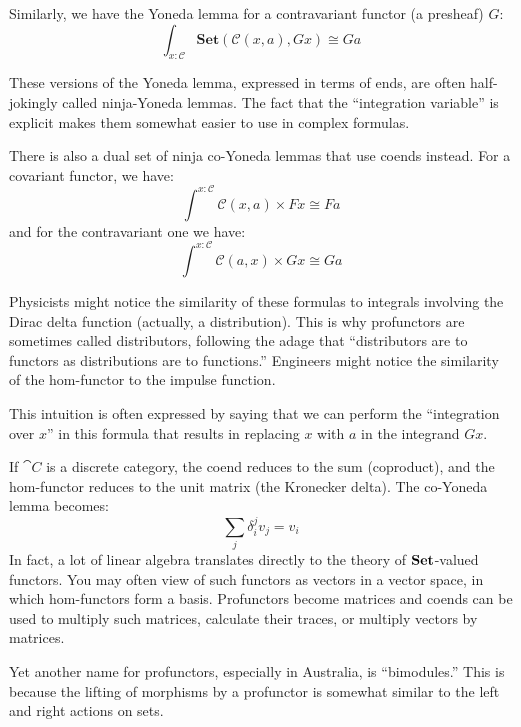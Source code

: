\documentclass[DaoFP]{subfiles}
\begin{document}
Similarly, we have the Yoneda lemma for a contravariant functor (a presheaf) $G$:
\[ \int_{x \colon \mathcal{C}} \mathbf{Set} (\mathcal{C}(x, a), G x) \cong G a \]

These versions of the Yoneda lemma, expressed in terms of ends, are often half-jokingly called ninja-Yoneda lemmas. The fact that the ``integration variable'' is explicit makes them somewhat easier to use in complex formulas.

There is also a dual set of ninja co-Yoneda lemmas that use coends instead. For a covariant functor, we have:
\[ \int^{x \colon \mathcal{C}} \mathcal{C}(x, a) \times F x \cong F a \]
and for the contravariant one we have:
\[ \int^{x \colon \mathcal{C}} \mathcal{C}(a, x) \times G x \cong G a \]

Physicists might notice the similarity of these formulas to integrals involving the Dirac delta function (actually, a distribution). This is why profunctors are sometimes called distributors, following the adage that ``distributors are to functors as distributions are to functions.'' Engineers might notice the similarity of the hom-functor to the impulse function.

This intuition is often expressed by saying that we can perform the ``integration over $x$'' in this formula that results in replacing $x$ with $a$ in the integrand $G x$. 

If $\cat C$ is a discrete category, the coend reduces to the sum (coproduct), and the hom-functor reduces to the unit matrix (the Kronecker delta). The co-Yoneda lemma becomes:
\[ \sum_j \delta_i^j v_j = v_i \]
In fact, a lot of linear algebra translates directly to the theory of $\mathbf{Set}$-valued functors. You may often view of such functors as vectors in a vector space, in which hom-functors form a basis. Profunctors become matrices and coends can be used to multiply such matrices, calculate their traces, or multiply vectors by matrices.

Yet another name for profunctors, especially in Australia, is ``bimodules.'' This is because the lifting of morphisms by a profunctor is somewhat similar to the left and right actions on sets. 
\end{document}
